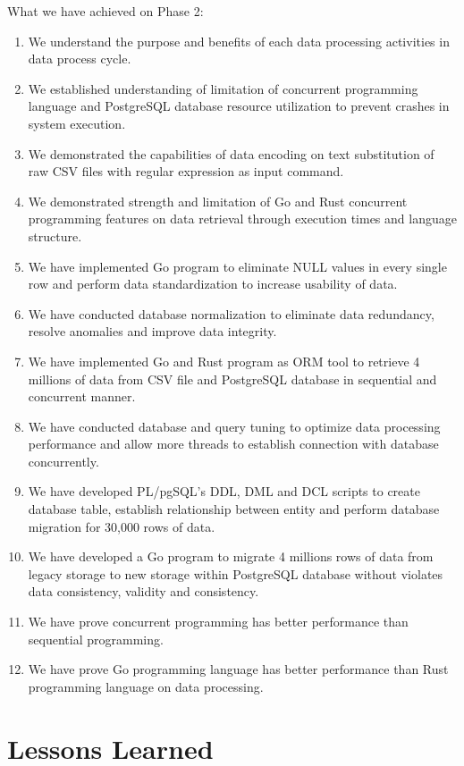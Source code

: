 What we have achieved on Phase 2:
\begin{enumerate}[topsep=0pt,itemsep=-1ex,partopsep=1ex,parsep=1.5ex]
	\item We understand the purpose and benefits of each data processing activities in data process cycle. 
	\item We established understanding of limitation of concurrent programming language and PostgreSQL database resource utilization to prevent crashes in system execution. 
	\item We demonstrated the capabilities of data encoding on text substitution of raw CSV files with regular expression as input command.  
	\item We demonstrated strength and limitation of Go and Rust concurrent programming features on data retrieval through execution times and language structure. 
	\item We have implemented Go program to eliminate NULL values in every single row and perform data standardization to increase usability of data. 
	\item We have conducted database normalization to eliminate data redundancy, resolve anomalies and improve data integrity. 
	\item We have implemented Go and Rust program as ORM tool to retrieve 4 millions of data from CSV file and PostgreSQL database in sequential and concurrent manner. 
	\item We have conducted database and query tuning to optimize data processing performance and allow more threads to establish connection with database concurrently. 
	\item We have developed PL/pgSQL's DDL, DML and DCL scripts to create database table, establish relationship between entity and perform database migration for 30,000 rows of data. 
	\item We have developed a Go program to migrate 4 millions rows of data from legacy storage to new storage within PostgreSQL database without violates data consistency, validity and consistency. 
	\item We have prove concurrent programming has better performance than sequential programming. 
	\item We have prove Go programming language has better performance than Rust programming language on data processing. 
	
\end{enumerate}


\section{Lessons Learned}

